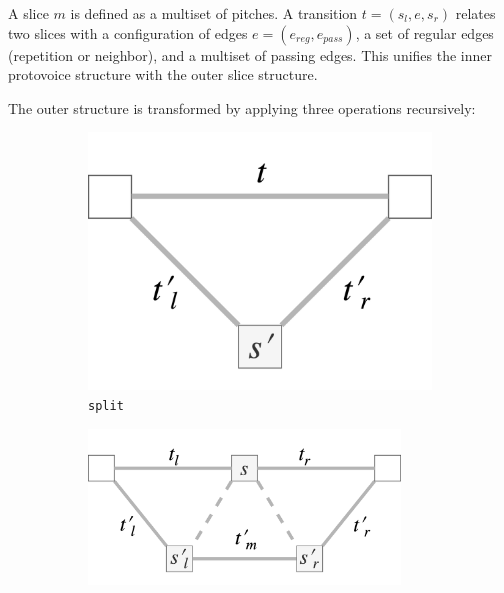 \documentclass[12pt,a4paper,twoside,openright]{report}
\theoremstyle{definition}
\begin{document}
\par 
A slice $m$ is defined as a multiset of pitches. A transition $t = (s_l, e, s_r)$ relates two slices with a configuration of edges $e=(e_{reg}, e_{pass})$, a set of regular edges (repetition or neighbor), and a multiset of passing edges. This unifies the inner protovoice structure with the outer slice structure. 
\par
The outer structure is transformed by applying three operations recursively:
\par

\begin{figure}
  \centering
  \begin{subfigure}[t]{.28\textwidth}
    \centering\includegraphics[keepaspectratio,width=\textwidth]{prep/outer/split}
    \caption{\texttt{split}}
    \label{fig:splitOp}
  \end{subfigure}
  \begin{subfigure}[t]{.46\textwidth}
    \centering\includegraphics[keepaspectratio,width=0.91\textwidth]{prep/outer/spread}

\end{subfigure}
\end{figure}
\end{document}

